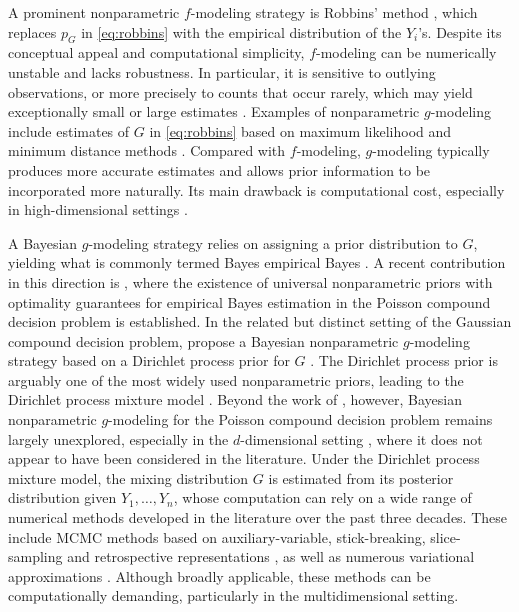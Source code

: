 \documentclass[twoside,12pt]{article}
\begin{document}
A prominent nonparametric $f$-modeling strategy is Robbins' method \citep{Rob(56)}, which replaces $p_{G}$ in \eqref{eq:robbins} with the empirical distribution of the $Y_{i}$'s. Despite its conceptual appeal and computational simplicity, $f$-modeling can be numerically unstable and lacks robustness. In particular, it is sensitive to outlying observations, or more precisely to counts that occur rarely, which may yield exceptionally small or large estimates \citep{Bro(13),She(24)}. Examples of nonparametric $g$-modeling include estimates of $G$ in \eqref{eq:robbins} based on maximum likelihood and minimum distance methods \citep{Jan(24)}. Compared with $f$-modeling, $g$-modeling typically produces more accurate estimates and allows prior information to be incorporated more naturally. Its main drawback is computational cost, especially in  high-dimensional settings \citep{Jan(23),Teh(25)}.

A Bayesian $g$-modeling strategy relies on assigning a prior distribution to $G$, yielding what is commonly termed Bayes empirical Bayes \citep{Dee(81),Efr(19)}. A recent contribution in this direction is \citet{Can(26)}, where the existence of universal nonparametric priors with optimality guarantees for empirical Bayes estimation in the Poisson compound decision problem is established. In the related but distinct setting of the Gaussian compound decision problem, \citet{Ign(26)} propose a Bayesian nonparametric $g$-modeling strategy based on a Dirichlet process prior for $G$ \citep{Fer(73)}. The Dirichlet process prior is arguably one of the most widely used nonparametric priors, leading to the Dirichlet process mixture model \citep{Lo(84)}. Beyond the work of \citet{Can(26)}, however, Bayesian nonparametric $g$-modeling for the Poisson compound decision problem remains largely unexplored, especially in the $d$-dimensional setting \citep{Bro(85),Joh(86)}, where it does not appear to have been considered in the literature. Under the Dirichlet process mixture model, the mixing distribution $G$ is estimated from its posterior distribution given $Y_{1},\ldots,Y_{n}$, whose computation can rely on a wide range of numerical methods developed in the literature over the past three decades. These include MCMC methods based on auxiliary-variable, stick-breaking, slice-sampling and retrospective representations \citep{Nea(00),IshJam(01),Wal(07),PapRob(08)}, as well as numerous variational approximations \citep{BleJor(06)}. Although broadly applicable, these methods can be computationally demanding, particularly in the multidimensional setting.
\end{document}
